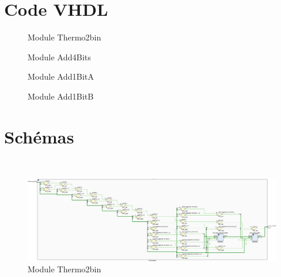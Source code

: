 \newpage
\appendix
\section{Code VHDL}

\begin{figure}[H]
	\tiny
	\centering
	\begin{varwidth}{\linewidth}
		
	\end{varwidth}
	\caption{Module Thermo2bin}
\end{figure}

\begin{figure}[H]
	\tiny
	\centering
	\begin{varwidth}{\linewidth}
		
	\end{varwidth}
	\caption{Module Add4Bits}
\end{figure}

\begin{figure}[H]
	\tiny
	\centering
	\begin{varwidth}{\linewidth}
		
	\end{varwidth}
	\caption{Module Add1BitA}
\end{figure}

\begin{figure}[H]
	\tiny
	\centering
	\begin{varwidth}{\linewidth}
		
	\end{varwidth}
	\caption{Module Add1BitB}
\end{figure}

\section{Schémas}

\\


\begin{figure}[H]
	\centering
	\includegraphics[width=\textwidth]{assets/img/schematic-thermo2bin.png}
	\caption{Module Thermo2bin}
\end{figure}

